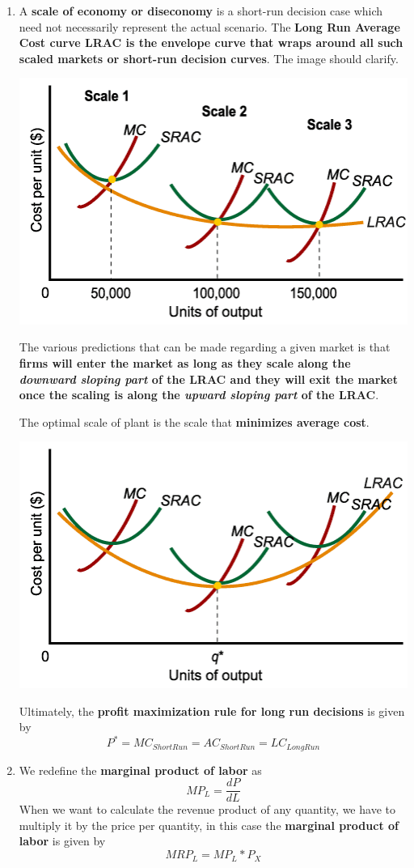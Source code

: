 \documentclass[12pt]{article}
\begin{document}
\begin{enumerate}
\item A \textbf{scale of economy or diseconomy} is a short-run decision case which need not necessarily represent the actual scenario. The \textbf{Long Run Average Cost curve LRAC is the envelope curve that wraps around all such scaled markets or short-run decision curves}. The image should clarify.
\begin{center}
\includegraphics[scale=0.9]{lrac.png}
\end{center}
The various predictions that can be made regarding a given market is that \textbf{firms will enter the market as long as they scale along the \textit{downward sloping part} of the LRAC and they will exit the market once the scaling is along the \textit{upward sloping part} of the LRAC}.

The optimal scale of plant is the scale that \textbf{minimizes average cost}.
\begin{center}
\includegraphics[scale=0.5]{lracscale.png}
\end{center}
Ultimately, the \textbf{profit maximization rule for long run decisions} is given by $$P^* = MC_{Short Run} = AC_{Short Run} = LC_{Long Run}$$
\item We redefine the \textbf{marginal product of labor} as 
$$MP_L = \frac{dP}{dL}$$ When we want to calculate the revenue product of any quantity, we have to multiply it by the price per quantity, in this case the \textbf{marginal product of labor} is given by
$$MRP_L = MP_L*P_X$$


\end{enumerate}
\end{document}
